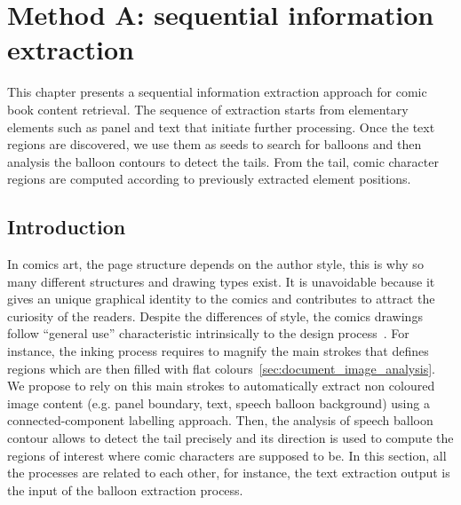 \chapter{Method A: sequential information extraction}%
\label{chap:sequential}
\graphicspath{{./chapters/3-sequential/figs/}}

This chapter presents a sequential information extraction approach for comic book content retrieval.
The sequence of extraction starts from elementary elements such as panel and text that initiate further processing.
Once the text regions are discovered, we use them as seeds to search for balloons and then analysis the balloon contours to detect the tails.
From the tail, comic character regions are computed according to previously extracted element positions.


\section{Introduction} %
\label{sec:introduction}

In comics art, the page structure depends on the author style, this is why so many different structures and drawing types exist.
It is unavoidable because it gives an unique graphical identity to the comics and contributes to attract the curiosity of the readers.
Despite the differences of style, the comics drawings follow ``general use'' characteristic intrinsically to the design process~\cite{mccloud2006Making}.
For instance, the inking process requires to magnify the main strokes that defines regions which are then filled with flat colours~\ref{sec:document_image_analysis}.
We propose to rely on this main strokes to automatically extract non coloured image content (e.g. panel boundary, text, speech balloon background) using a connected-component labelling approach.
Then, the analysis of speech balloon contour allows to detect the tail precisely and its direction is used to compute the regions of interest where comic characters are supposed to be.
In this section, all the processes are related to each other, for instance, the text extraction output is the input of the balloon extraction process.


